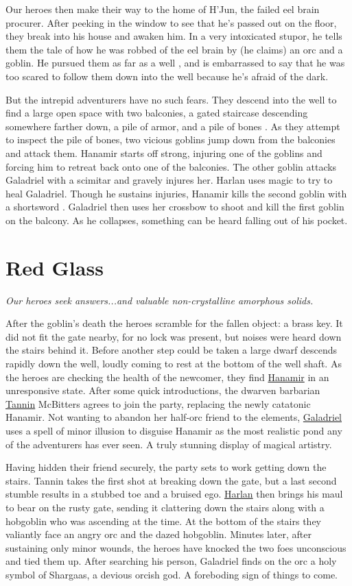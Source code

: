 \documentclass[smalldemyvopaper,11pt,twoside,onecolumn,openright,extrafontsizes]{memoir}
\newcommand{\chapdesc}[1]{
    \begin{flushright}
    \emph{{#1}}
    \end{flushright}
    \vspace{26pt}
}
\begin{document}
Our heroes then make their way to the home of H'Jun, the failed eel
brain procurer. After peeking in the window to see that he's passed out
on the floor, they break into his house and awaken him. In a very
intoxicated stupor, he tells them the tale of how he was robbed of the
eel brain by (he claims) an orc and a goblin. He pursued them as far as
a well , and is embarrassed to say that he was too scared to follow them
down into the well because he's afraid of the dark.

But the intrepid adventurers have no such fears. They descend into the
well to find a large open space with two balconies, a gated staircase
descending somewhere farther down, a pile of armor, and a pile of bones
. As they attempt to inspect the pile of bones, two vicious goblins jump
down from the balconies and attack them. Hanamir starts off strong,
injuring one of the goblins and forcing him to retreat back onto one of
the balconies. The other goblin attacks Galadriel with a scimitar and
gravely injures her. Harlan uses magic to try to heal Galadriel. Though
he sustains injuries, Hanamir kills the second goblin with a shortsword
. Galadriel then uses her crossbow to shoot and kill the first goblin on
the balcony. As he collapses, something can be heard falling out of his
pocket.


\chapter{Red Glass}
\chapdesc{Our heroes seek answers...and valuable non-crystalline amorphous solids.}

After the goblin's death the heroes scramble for the fallen object: a
brass key. It did not fit the gate nearby, for no lock was present, but
noises were heard down the stairs behind it. Before another step could
be taken a large dwarf descends rapidly down the well, loudly coming to
rest at the bottom of the well shaft. As the heroes are checking the
health of the newcomer, they find \href{/characters/hanamir/}{Hanamir}
in an unresponsive state. After some quick introductions, the dwarven
barbarian \href{/characters/tannin/}{Tannin} McBitters agrees to join
the party, replacing the newly catatonic Hanamir. Not wanting to abandon
her half-orc friend to the elements,
\href{/characters/galadriel/}{Galadriel} uses a spell of minor illusion
to disguise Hanamir as the most realistic pond any of the adventurers
has ever seen. A truly stunning display of magical artistry.

Having hidden their friend securely, the party sets to work getting down
the stairs. Tannin takes the first shot at breaking down the gate, but a
last second stumble results in a stubbed toe and a bruised ego.
\href{/characters/harlan/}{Harlan} then brings his maul to bear on the
rusty gate, sending it clattering down the stairs along with a hobgoblin
who was ascending at the time. At the bottom of the stairs they
valiantly face an angry orc and the dazed hobgoblin. Minutes later,
after sustaining only minor wounds, the heroes have knocked the two foes
unconscious and tied them up. After searching his person, Galadriel
finds on the orc a holy symbol of Shargaas, a devious orcish god. A
foreboding sign of things to come.
\end{document}
